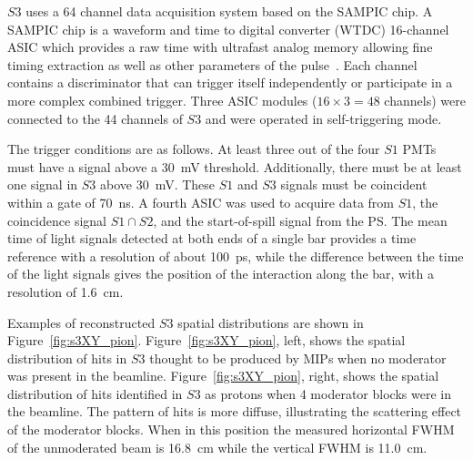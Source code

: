 $\mathit{S3}$ uses a 64 channel data acquisition system based on the SAMPIC chip.
A SAMPIC chip is a waveform and time to digital converter (WTDC) 16-channel ASIC which provides a raw time with ultrafast analog memory allowing fine timing extraction as well as other parameters of the pulse~\cite{SAMPIC}.
Each channel contains a discriminator that can trigger itself independently or participate in a more complex combined trigger. 
Three ASIC modules ($16\times3=48$ channels) were connected to the 44 channels of $\mathit{S3}$ and were operated in self-triggering mode.

The trigger conditions are as follows. At least three out of the four $\mathit{S1}$ PMTs must have a signal above a 30~mV threshold.
Additionally, there must be at least one signal in $\mathit{S3}$ above 30~mV.
These $\mathit{S1}$ and $\mathit{S3}$ signals must be coincident within a gate of 70~ns.
A fourth ASIC was used to acquire data from $\mathit{S1}$, the coincidence signal $\mathit{S1} \cap \mathit{S2}$, and the start-of-spill signal from the PS.
The mean time of light signals detected at both ends of a single bar provides a time reference with a resolution of about 100~ps, while the difference between the time of the light signals gives the position of the interaction along the bar, with a resolution of 1.6~cm.

Examples of reconstructed $\mathit{S3}$ spatial distributions are shown in Figure~\ref{fig:s3XY_pion}.
Figure~\ref{fig:s3XY_pion}, left, shows the spatial distribution of hits in $\mathit{S3}$ thought to be produced by MIPs when no moderator was present in the beamline.
Figure~\ref{fig:s3XY_pion}, right, shows the spatial distribution of hits identified in $\mathit{S3}$ as protons when 4 moderator blocks were in the beamline.
The pattern of hits is more diffuse, illustrating the scattering effect of the moderator blocks.
When in this position the measured horizontal FWHM of the unmoderated beam is 16.8~cm while the vertical FWHM is 11.0~cm.

